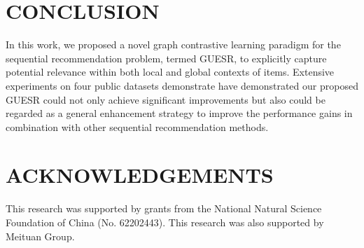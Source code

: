 \documentclass[runningheads]{llncs}
\begin{document}
\begin{table*}
	\caption{The performance comparison with the proposed enhancement module.}
	\centering
	\label{table:enhancement}
\end{table*}
\vspace{-30pt}

\section{CONCLUSION}
\vspace{-10pt}
In this work, we proposed a novel graph contrastive learning paradigm for the sequential recommendation problem, termed GUESR, to explicitly capture potential relevance within both local and global contexts of items. Extensive experiments on four public datasets demonstrate have demonstrated our proposed GUESR could not only achieve significant improvements but also could be regarded as a general enhancement strategy to improve the performance gains in combination with other sequential recommendation methods. 
\vspace{-10pt}
\section{ACKNOWLEDGEMENTS}
\vspace{-10pt}
This research was supported by grants from the National Natural Science Foundation of China (No. 62202443). This research was also supported by Meituan Group.




\vspace{-10pt}

\vspace{-35pt}
\end{document}
